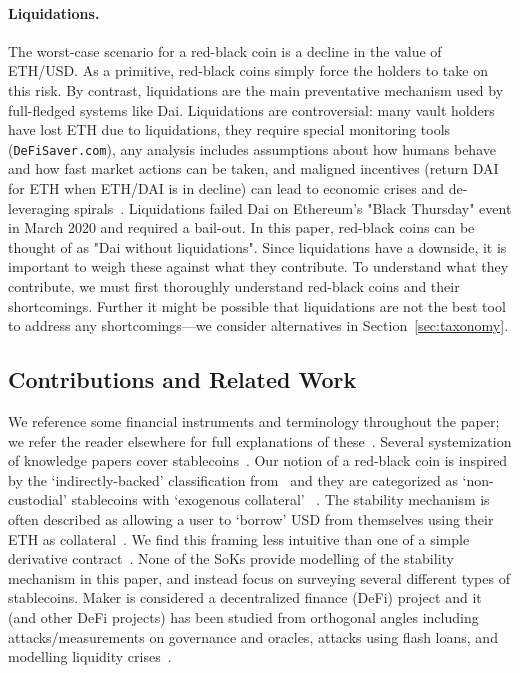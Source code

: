 \paragraph{Liquidations.} The worst-case scenario for a red-black coin is a decline in the value of ETH/USD. As a primitive, red-black coins simply force the holders to take on this risk. By contrast, liquidations are the main preventative mechanism used by full-fledged systems like Dai. Liquidations are controversial: many vault holders have lost ETH due to liquidations, they require special monitoring tools (\eg \texttt{DeFiSaver.com}), any analysis includes assumptions about how humans behave and how fast market actions can be taken, and maligned incentives (\eg return DAI for ETH when ETH/DAI is in decline) can lead to economic crises and de-leveraging spirals~\cite{GPH+20,KMM20}. Liquidations failed Dai on Ethereum's "Black Thursday" event in March 2020 and required a bail-out. In this paper, red-black coins can be thought of as "Dai without liquidations". Since liquidations have a downside, it is important to weigh these against what they contribute. To understand what they contribute, we must first thoroughly understand red-black coins and their shortcomings. Further it might be possible that liquidations are not the best tool to address any shortcomings---we consider alternatives in Section~\ref{sec:taxonomy}.


\subsection{Contributions and Related Work} We reference some financial instruments and terminology throughout the paper; we refer the reader elsewhere for full explanations of these~\cite{Har03}. Several systemization of knowledge papers cover stablecoins~\cite{PHP+19,MSS20,CDM20,klages2020stablecoins}. Our notion of a red-black coin is inspired by the `indirectly-backed' classification from~\cite{CDM20} and they are categorized as `non-custodial' stablecoins with `exogenous collateral' ~\cite{klages2020stablecoins}. The stability mechanism is often described as allowing a user to `borrow' USD from themselves using their ETH as collateral~\cite{PHP+19,MSS20}. We find this framing less intuitive than one of a simple derivative contract~\cite{CDM20}. None of the SoKs provide modelling of the stability mechanism in this paper, and instead focus on surveying several different types of stablecoins. Maker is considered a decentralized finance (DeFi) project and it (and other DeFi projects) has been studied from orthogonal angles including attacks/measurements on governance and oracles, attacks using flash loans, and modelling liquidity crises~\cite{GRB20,GPH+20,QZLG20,KMM20,klages2020stablecoins}.

